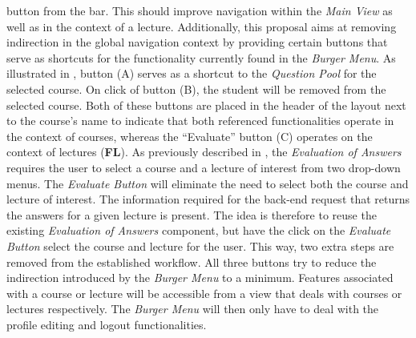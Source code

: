 \begin{figure}
\end{figure} button from the bar. This should improve navigation within the \emph{Main View} as well as in the context of a lecture.  Additionally, this proposal aims at removing indirection in the global navigation context by providing certain buttons that serve as shortcuts for the functionality currently found in the \emph{Burger Menu}. As illustrated in , button (A) serves as a shortcut to the \emph{Question Pool} for the selected course. On click of button (B), the student will be removed from the selected course. Both of these buttons are placed in the header of the layout next to the course’s name to indicate that both referenced functionalities operate in the context of courses, whereas the “Evaluate” button (C) operates on the context of lectures (\textbf{FL}).
\newline
\newline 
As previously described in , the \emph{Evaluation of Answers} requires the user to select a course and a lecture of interest from two drop-down menus.
The \emph{Evaluate Button} will eliminate the need to select both the course and lecture of interest. The information required for the back-end request that returns the answers for a given lecture is present. The idea is therefore to reuse the existing \emph{Evaluation of Answers} component, but have the click on the \emph{Evaluate Button} select the course and lecture for the user. This way, two extra steps are removed from the established workflow.
All three buttons try to reduce the indirection introduced by the \emph{Burger Menu} to a minimum. Features associated with a course or lecture will be accessible from a view that deals with courses or lectures respectively. The \emph{Burger Menu} will then only have to deal with the profile editing and logout functionalities.

